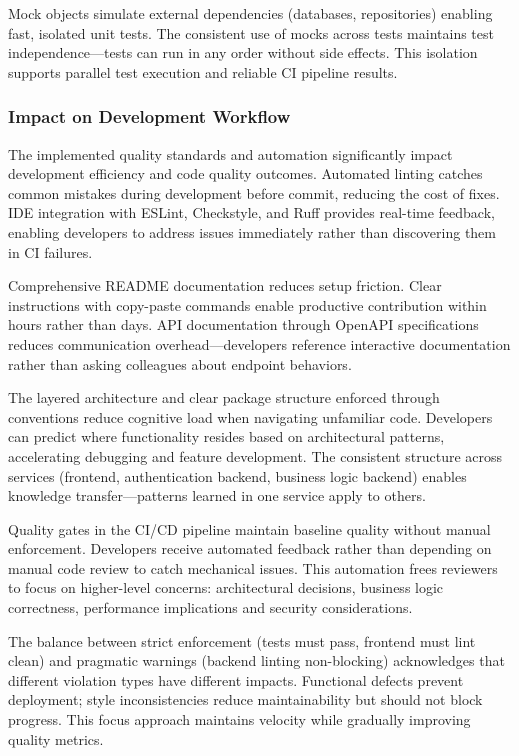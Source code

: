 \documentclass[12pt,a4paper]{article}
\begin{document}
Mock objects simulate external dependencies (databases, repositories) enabling fast, isolated unit tests. The consistent use of mocks across tests maintains test independence—tests can run in any order without side effects. This isolation supports parallel test execution and reliable CI pipeline results.

\subsubsection{Impact on Development Workflow}

The implemented quality standards and automation significantly impact development efficiency and code quality outcomes. Automated linting catches common mistakes during development before commit, reducing the cost of fixes. IDE integration with ESLint, Checkstyle, and Ruff provides real-time feedback, enabling developers to address issues immediately rather than discovering them in CI failures.\newline

Comprehensive README documentation reduces setup friction. Clear instructions with copy-paste commands enable productive contribution within hours rather than days. API documentation through OpenAPI specifications reduces communication overhead—developers reference interactive documentation rather than asking colleagues about endpoint behaviors.\newline

The layered architecture and clear package structure enforced through conventions reduce cognitive load when navigating unfamiliar code. Developers can predict where functionality resides based on architectural patterns, accelerating debugging and feature development. The consistent structure across services (frontend, authentication backend, business logic backend) enables knowledge transfer—patterns learned in one service apply to others.\newline

Quality gates in the CI/CD pipeline maintain baseline quality without manual enforcement. Developers receive automated feedback rather than depending on manual code review to catch mechanical issues. This automation frees reviewers to focus on higher-level concerns: architectural decisions, business logic correctness, performance implications and security considerations.\newline

The balance between strict enforcement (tests must pass, frontend must lint clean) and pragmatic warnings (backend linting non-blocking) acknowledges that different violation types have different impacts. Functional defects prevent deployment; style inconsistencies reduce maintainability but should not block progress. This focus approach maintains velocity while gradually improving quality metrics.
\end{document}
